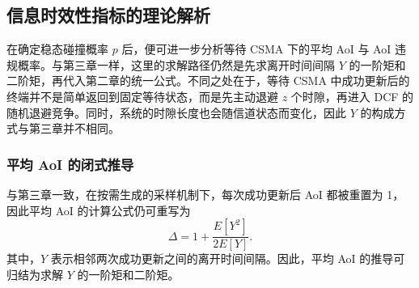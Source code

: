 \subsection{信息时效性指标的理论解析}

在确定稳态碰撞概率 $p$ 后，便可进一步分析等待 CSMA 下的平均 AoI 与 AoI 违规概率。与第三章一样，这里的求解路径仍然是先求离开时间间隔 $Y$ 的一阶矩和二阶矩，再代入第二章的统一公式。不同之处在于，等待 CSMA 中成功更新后的终端并不是简单返回到固定等待状态，而是先主动退避 $z$ 个时隙，再进入 DCF 的随机退避竞争。同时，系统的时隙长度也会随信道状态而变化，因此 $Y$ 的构成方式与第三章并不相同。

\subsubsection{平均 AoI 的闭式推导}

与第三章一致，在按需生成的采样机制下，每次成功更新后 AoI 都被重置为 1，因此平均 AoI 的计算公式仍可重写为
\begin{equation}\label{cp4_avg_aoi}
    \Delta = 1 + \frac{E[Y^2]}{2E[Y]}.
\end{equation}
其中，$Y$ 表示相邻两次成功更新之间的离开时间间隔。因此，平均 AoI 的推导可归结为求解 $Y$ 的一阶矩和二阶矩。

